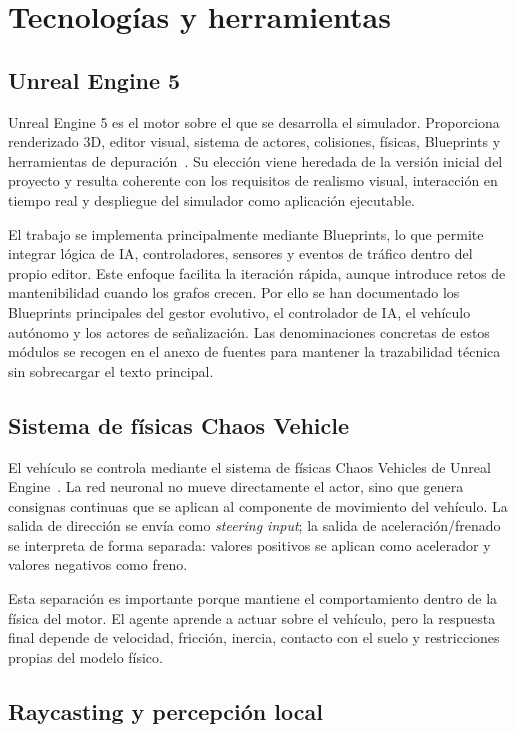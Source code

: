 \chapter{Tecnologías y herramientas}

\section{Unreal Engine 5}

Unreal Engine 5 es el motor sobre el que se desarrolla el simulador. Proporciona renderizado 3D, editor visual, sistema de actores, colisiones, físicas, Blueprints y herramientas de depuración~\cite{unreal,blueprints}. Su elección viene heredada de la versión inicial del proyecto y resulta coherente con los requisitos de realismo visual, interacción en tiempo real y despliegue del simulador como aplicación ejecutable.

El trabajo se implementa principalmente mediante Blueprints, lo que permite integrar lógica de IA, controladores, sensores y eventos de tráfico dentro del propio editor. Este enfoque facilita la iteración rápida, aunque introduce retos de mantenibilidad cuando los grafos crecen. Por ello se han documentado los Blueprints principales del gestor evolutivo, el controlador de IA, el vehículo autónomo y los actores de señalización. Las denominaciones concretas de estos módulos se recogen en el anexo de fuentes para mantener la trazabilidad técnica sin sobrecargar el texto principal.

\section{Sistema de físicas Chaos Vehicle}

El vehículo se controla mediante el sistema de físicas Chaos Vehicles de Unreal Engine~\cite{chaos}. La red neuronal no mueve directamente el actor, sino que genera consignas continuas que se aplican al componente de movimiento del vehículo. La salida de dirección se envía como \textit{steering input}; la salida de aceleración/frenado se interpreta de forma separada: valores positivos se aplican como acelerador y valores negativos como freno.

Esta separación es importante porque mantiene el comportamiento dentro de la física del motor. El agente aprende a actuar sobre el vehículo, pero la respuesta final depende de velocidad, fricción, inercia, contacto con el suelo y restricciones propias del modelo físico.

\section{Raycasting y percepción local}


